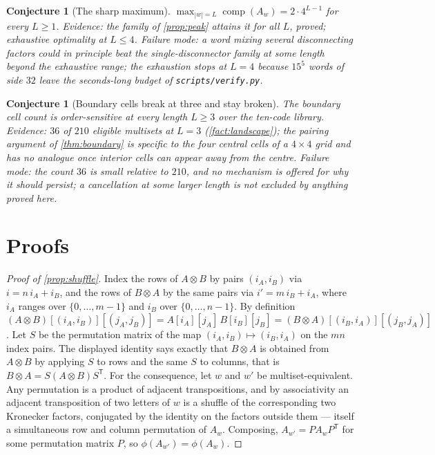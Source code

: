 \documentclass[11pt]{amsart}
\newtheorem{conjecture}[theorem]{Conjecture}
\theoremstyle{definition}
\theoremstyle{remark}
\begin{document}
\begin{conjecture}[The sharp maximum]
\label{con:peak}
$\max_{|w| = L} \operatorname{comp}(A_w) = 2 \cdot 4^{L-1}$ for every $L \ge 1$. \emph{Evidence:} the family of \cref{prop:peak} attains it for all $L$, proved; exhaustive optimality at $L \le 4$. \emph{Failure mode:} a word mixing several disconnecting factors could in principle beat the single-disconnector family at some length beyond the exhaustive range; the exhaustion stops at $L=4$ because $15^5$ words of side $32$ leave the seconds-long budget of \texttt{scripts/verify.py}.
\end{conjecture}

\begin{conjecture}[Boundary cells break at three and stay broken]
\label{con:boundary}
The boundary cell count is order-sensitive at every length $L \ge 3$ over the ten-code library. \emph{Evidence:} $36$ of $210$ eligible multisets at $L=3$ (\cref{fact:landscape}); the pairing argument of \cref{thm:boundary} is specific to the four central cells of a $4 \times 4$ grid and has no analogue once interior cells can appear away from the centre. \emph{Failure mode:} the count $36$ is small relative to $210$, and no mechanism is offered for why it should persist; a cancellation at some larger length is not excluded by anything proved here.
\end{conjecture}

\section{Proofs}
\label{sec:proofs}

\begin{proof}[Proof of \cref{prop:shuffle}]
Index the rows of $A \otimes B$ by pairs $(i_A, i_B)$ via $i = n\,i_A + i_B$, and the rows of $B \otimes A$ by the same pairs via $i' = m\,i_B + i_A$, where $i_A$ ranges over $\{0,\dots,{m-1}\}$ and $i_B$ over $\{0,\dots,{n-1}\}$. By definition $(A \otimes B)[(i_A,i_B)][(j_A,j_B)] = A[i_A][j_A]\,B[i_B][j_B] = (B \otimes A)[(i_B,i_A)][(j_B,j_A)]$. Let $S$ be the permutation matrix of the map $(i_A,i_B) \mapsto (i_B,i_A)$ on the $mn$ index pairs. The displayed identity says exactly that $B \otimes A$ is obtained from $A \otimes B$ by applying $S$ to rows and the same $S$ to columns, that is $B \otimes A = S (A \otimes B) S^{\mathsf T}$. For the consequence, let $w$ and $w'$ be multiset-equivalent. Any permutation is a product of adjacent transpositions, and by associativity an adjacent transposition of two letters of $w$ is a shuffle of the corresponding two Kronecker factors, conjugated by the identity on the factors outside them --- itself a simultaneous row and column permutation of $A_w$. Composing, $A_{w'} = P A_w P^{\mathsf T}$ for some permutation matrix $P$, so $\phi(A_{w'}) = \phi(A_w)$.
\end{proof}
\end{document}
